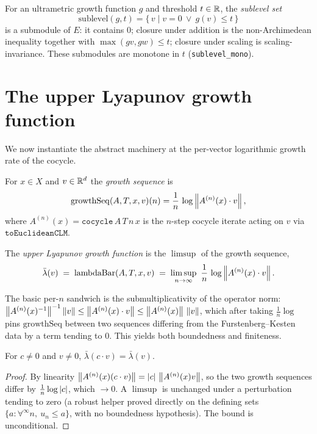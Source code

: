 \begin{definition}\label{sublevel}
  \leanok
  For an ultrametric growth function $g$ and threshold $t\in\mathbb{R}$, the
  \emph{sublevel set}
  \[ \mathrm{sublevel}(g,t) = \{\, v \mid v=0 \ \lor\ g(v)\le t \,\} \]
  is a submodule of $E$: it contains $0$; closure under addition is the
  non-Archimedean inequality together with $\max(g v,g w)\le t$; closure under
  scaling is scaling-invariance. These submodules are monotone in $t$
  (\texttt{sublevel\_mono}).
\end{definition}

\section{The upper Lyapunov growth function}

We now instantiate the abstract machinery at the per-vector logarithmic growth
rate of the cocycle.

\begin{definition}\label{growthSeq}
  \leanok
  For $x\in X$ and $v\in\mathbb{R}^d$ the \emph{growth sequence} is
  \[ \mathrm{growthSeq}(A,T,x,v)(n)
     = \frac1n\,\log\left\lVert A^{(n)}(x)\cdot v \right\rVert, \]
  where $A^{(n)}(x)=\mathtt{cocycle}\,A\,T\,n\,x$ is the $n$-step cocycle iterate
  acting on $v$ via $\mathtt{toEuclideanCLM}$.
\end{definition}

\begin{definition}\label{lambdaBar}
  \leanok
  The \emph{upper Lyapunov growth function} is the $\limsup$ of the growth
  sequence,
  \[ \bar\lambda(v) \;=\; \mathrm{lambdaBar}(A,T,x,v)
     \;=\; \limsup_{n\to\infty}\ \frac1n\,\log\left\lVert A^{(n)}(x)\cdot v \right\rVert. \]
\end{definition}

The basic per-$n$ sandwich is the submultiplicativity of the operator norm:
$\left\lVert A^{(n)}(x)^{-1} \right\rVert^{-1}\left\lVert v \right\rVert \le \left\lVert A^{(n)}(x)\cdot v \right\rVert
\le \left\lVert A^{(n)}(x) \right\rVert\,\left\lVert v \right\rVert$, which after taking $\tfrac1n\log$ pins
$\mathrm{growthSeq}$ between two sequences differing from the Furstenberg--Kesten
data by a term tending to $0$. This yields both boundedness and finiteness.

\begin{lemma}\label{lambdaBar_smul}
  \leanok
  For $c\neq 0$ and $v\neq 0$, $\bar\lambda(c\cdot v)=\bar\lambda(v)$.
  \begin{proof}\leanok
  By linearity $\left\lVert A^{(n)}(x)(c\cdot v) \right\rVert=\left\lvert c \right\rvert\,\left\lVert A^{(n)}(x)v \right\rVert$, so the
  two growth sequences differ by $\tfrac1n\log\left\lvert c \right\rvert$, which $\to 0$. A
  $\limsup$ is unchanged under a perturbation tending to zero (a robust helper
  proved directly on the defining sets $\{a:\forall^{\infty} n,\ u_n\le a\}$, with
  no boundedness hypothesis). The bound is unconditional.
  \end{proof}
\end{lemma}

